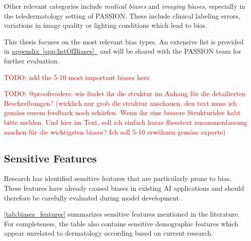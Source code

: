 \documentclass[12pt, a4paper, oneside]{book}   	%
\renewcommand{\todo}[1]{\textcolor{red}{TODO: #1}}
\newcommand{\linkapp}[1]{\hyperref[#1]{appendix~\ref{#1}~\nameref{#1}}}
\begin{document}
			Other relevant categories include \textit{medical biases} and \textit{imaging biases}, especially in the teledermatology setting of PASSION. These include clinical labeling errors, variations in image quality or lighting conditions which lead to bias.
			
			
			This thesis focuses on the most relevant bias types. An extensive list is provided in \linkapp{app:listOfBiases} and will be shared with the PASSION team for further evaluation.
			
			\todo{add the 5-10 most important biases here}
			
			\todo{@proofreaders: wie findet ihr die struktur im Anhang für die detailierten Beschreibungen? (wirklich nur grob die struktur anschauen, den text muss ich gemäss eurem feedback noch schärfen. Wenn ihr eine bessere Strukturidee habt bitte melden. Und hier im Text, soll ich einfach kurze fliesstext zusammenfassung machen für die wichtigsten biases? Ich soll 5-10 erwähnen gemäss experte)}
			
			
			\subsection{Sensitive Features}
			Research has identified sensitive features that are particularly prone to bias. These features have already caused biases in existing \gls{AI} applications and should therefore be carefully evaluated during model development \autocite{Mehrabi_2021}.
			
			\autoref{tab:biases_features} summarizes sensitive features mentioned in the literature. For completeness, the table also contains sensitive demographic features which appear unrelated to dermatology according based on current research.
			

			
\end{document}
